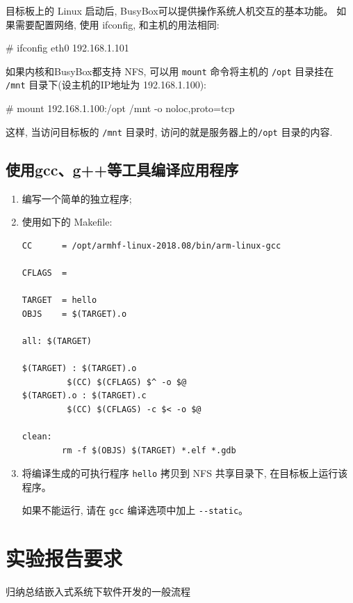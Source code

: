 目标板上的 Linux 启动后, BusyBox可以提供操作系统人机交互的基本功能。
如果需要配置网络, 使用 ifconfig, 和主机的用法相同:

\begin{blockcode}
# ifconfig eth0 192.168.1.101
\end{blockcode}

如果内核和BusyBox都支持 NFS, 可以用 \verb|mount| 命令将主机的 \verb|/opt|
目录挂在 \verb|/mnt| 目录下(设主机的IP地址为 192.168.1.100):

\begin{blockcode}
# mount 192.168.1.100:/opt /mnt -o noloc,proto=tcp
\end{blockcode}

这样, 当访问目标板的 \verb|/mnt| 目录时, 访问的就是服务器上的\verb|/opt|
目录的内容.

\subsection{使用gcc、g++等工具编译应用程序}
\begin{enumerate}
    \item 编写一个简单的独立程序;
    \item 使用如下的 Makefile:

\lstset{language=make}
\begin{lstlisting}
CC      = /opt/armhf-linux-2018.08/bin/arm-linux-gcc

CFLAGS  =

TARGET  = hello
OBJS    = $(TARGET).o

all: $(TARGET)

$(TARGET) : $(TARGET).o
         $(CC) $(CFLAGS) $^ -o $@
$(TARGET).o : $(TARGET).c
         $(CC) $(CFLAGS) -c $< -o $@

clean:
        rm -f $(OBJS) $(TARGET) *.elf *.gdb
\end{lstlisting}

    \item 将编译生成的可执行程序 \verb|hello| 拷贝到 NFS 共享目录下,
        在目标板上运行该程序。

		如果不能运行, 请在 \verb|gcc| 编译选项中加上 \verb|--static|。
\end{enumerate}

\section{实验报告要求}
归纳总结嵌入式系统下软件开发的一般流程
